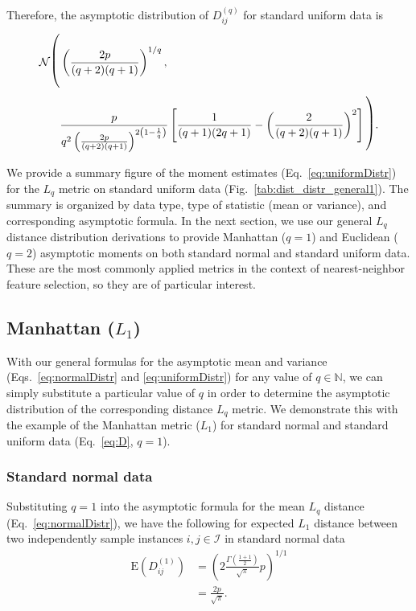 \documentclass[10pt,letterpaper]{article}
\begin{document}
Therefore, the asymptotic distribution of $D^{(q)}_{ij}$ for standard uniform data is
%
\begin{equation}\label{eq:uniformDistr}
\begin{split}
\mathcal{N}{\text{\LARGE $\Biggl($}}& \left(\frac{2p}{(q + 2)(q + 1)}\right)^{1/q}, \\
& \frac{p}{q^2\left(\frac{2p}{(q + 2)(q + 1)}\right)^{2\left(1 - \frac{1}{q}\right)}}\left[\frac{1}{(q + 1)(2q + 1)} - \left(\frac{2}{(q + 2)(q + 1)}\right)^2\right]{\text{\LARGE $\Biggr)$}}.
\end{split}
\end{equation}

We provide a summary figure of the moment estimates (Eq.~\ref{eq:uniformDistr}) for the $L_q$ metric on standard uniform data (Fig.~\ref{tab:dist_distr_general1}). The summary is organized by data type, type of statistic (mean or variance), and corresponding asymptotic formula. In the next section, we use our general $L_q$ distance distribution derivations to provide Manhattan ($q=1$) and Euclidean ($q=2$) asymptotic moments on both standard normal and standard uniform data. These are the most commonly applied metrics in the context of nearest-neighbor feature selection, so they are of particular interest.

\subsection*{Manhattan \texorpdfstring{($L_1$)}{}}

With our general formulas for the asymptotic mean and variance (Eqs.~\ref{eq:normalDistr} and \ref{eq:uniformDistr}) for any value of $q \in \mathbb{N}$, we can simply substitute a particular value of $q$ in order to determine the asymptotic distribution of the corresponding distance $L_q$ metric. We demonstrate this with the example of the Manhattan metric ($L_1$) for standard normal and standard uniform data (Eq.~\ref{eq:D}, $q=1$).

\subsubsection*{Standard normal data}

Substituting $q=1$ into the asymptotic formula for the mean $L_q$ distance (Eq.~\ref{eq:normalDistr}), we have the following for expected $L_1$ distance between two independently sample instances $i,j \in \mathcal{I}$ in standard normal data
%
\begin{equation}\label{eq:normalManMean}
\begin{aligned}
\text{E}\left(D^{(1)}_{ij}\right) &= \left(2\frac{\Gamma\left(\frac{1 + 1}{2}\right)}{\sqrt{\pi}}p\right)^{1/1} \\
&= \frac{2p}{\sqrt{\pi}}.
\end{aligned}
\end{equation}
\end{document}
